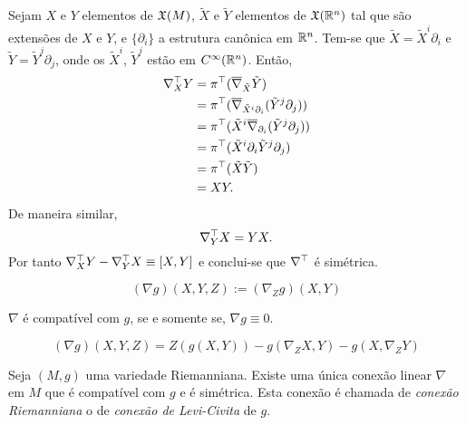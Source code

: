 \begin{demonstracao}
	Sejam $X$ e $Y$ elementos de $\mathfrak{X}(M)$, $\tilde{X}$ e $\tilde{Y}$ elementos de $\mathfrak{X}(\mathbb{R}^n)$ tal que são extensões de $X$ e $Y$, e $\{ \partial_i \}$ a estrutura canônica em $\mathbb{R}^n$. Tem-se que $\tilde{X} = \tilde{X}^i \partial_i$ e $\tilde{Y} = \tilde{Y}^j \partial_j$, onde os $\tilde{X}^i$, $\tilde{Y}^j$ estão em $C^\infty(\mathbb{R}^n)$. Então,
	\begin{align*}
		\nabla^\top_X Y &= \pi^\top (\overline{\nabla}_{\tilde{X}} \tilde{Y})\\
		&= \pi^\top (\overline{\nabla}_{\tilde{X}^i \partial_i} (\tilde{Y}^j \partial_j))\\
		&= \pi^\top (\tilde{X}^i \overline{\nabla}_{\partial_i} (\tilde{Y}^j \partial_j))\\
		&= \pi^\top (\tilde{X}^i \partial_i \tilde{Y}^j \partial_j)\\
		&= \pi^\top (\tilde{X} \tilde{Y})\\
		&= XY.
	\end{align*}
	De maneira similar,
	\begin{equation*}
		\nabla^\top_Y X = YX.
	\end{equation*}
	Por tanto $ \nabla^\top_X Y - \nabla^\top_Y X \equiv [X,Y] $ e conclui-se que $\nabla^\top$ é simétrica.
\end{demonstracao}

\begin{definicao}
	\begin{equation*}
	(\nabla g)(X,Y,Z) := (\nabla_Z g)(X,Y)
	\end{equation*}
\end{definicao}

\begin{lema}\label{compatibilidade-duma-conexao-riemanniana-com-uma-metrica-usando-a-derivada-covariante}
	$\nabla$ é compatível com $g$, se e somente se, $\nabla g \equiv 0$.
\end{lema}

\begin{lema}\label{deriva-covariante-de-uma-metrica}
	\begin{equation*}
	(\nabla g)(X,Y,Z) = Z(g(X,Y)) - g(\nabla_Z X, Y) - g(X, \nabla_Z Y)
	\end{equation*}
\end{lema}

\begin{teorema}\label{conexao-riemanniana}
	Seja $(M,g)$ uma variedade Riemanniana. Existe uma única conexão linear $\nabla$ em $M$ que é compatível com $g$ e é simétrica.
	Esta conexão é chamada de \emph{conexão Riemanniana} o de \emph{conexão de Levi-Civita} de $g$.
\end{teorema}


